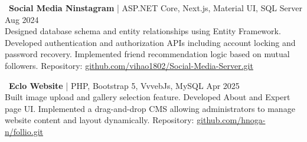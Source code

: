 \documentclass[letterpaper,11pt]{article}
\begin{document}
\vspace{6pt}

\textbullet\ \textbf{Social Media Ninstagram} | ASP.NET Core, Next.js, Material UI, SQL Server \hfill Aug 2024\\
Designed database schema and entity relationships using Entity Framework. Developed authentication and authorization APIs including account locking and password recovery. Implemented friend recommendation logic based on mutual followers. Repository: \href{https://github.com/vihao1802/Social-Media-Server.git}{github.com/vihao1802/Social-Media-Server.git}


\vspace{6pt}

\textbullet\ \textbf{Eclo Website} | PHP, Bootstrap 5, VvvebJs, MySQL \hfill Apr 2025\\
Built image upload and gallery selection feature. Developed About and Expert page UI. Implemented a drag-and-drop CMS allowing administrators to manage website content and layout dynamically. Repository: \href{https://github.com/hnoga-n/follio.git}{github.com/hnoga-n/follio.git}

    
\end{document}
